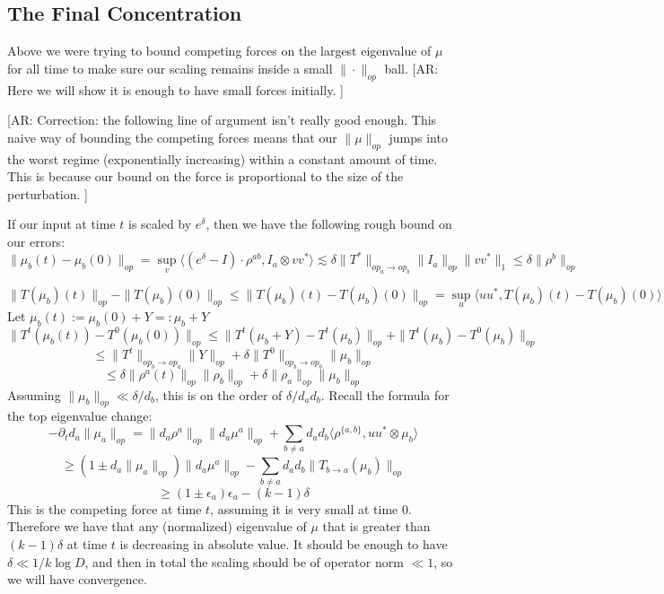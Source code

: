 \documentclass{article}
\newcommand{\AR}[1]{{\color{orange}[AR: #1]}}
\begin{document}
\subsection{The Final Concentration}
Above we were trying to bound competing forces on the largest eigenvalue of $\mu$ for all time to make sure our scaling remains inside a small $\|\cdot\|_{op}$ ball. \AR{Here we will show it is enough to have small forces initially. }

\AR{Correction: the following line of argument isn't really good enough. This naive way of bounding the competing forces means that our $\|\mu\|_{op}$ jumps into the worst regime (exponentially increasing) within a constant amount of time. This is because our bound on the force is proportional to the size of the perturbation. }

If our input at time $t$ is scaled by $e^{\delta}$, then we have the following rough bound on our errors:
\[ \|\mu_{b}(t) - \mu_{b}(0)\|_{op} = \sup_{v} \langle (e^{\delta} - I) \cdot \rho^{ab}, I_{a} \otimes v v^{*} \rangle \lesssim \delta \|T^{*}\|_{op_{a} \to op_{b}} \|I_{a}\|_{op} \|v v^{*} \|_{1} \leq \delta \|\rho^{b}\|_{op}    \]

\[ \|T(\mu_{b})(t)\|_{op} - \|T(\mu_{b})(0)\|_{op} \leq \|T(\mu_{b})(t) - T(\mu_{b})(0)\|_{op}  = \sup_{u} \langle u u^{*}, T(\mu_{b})(t) - T(\mu_{b})(0) \rangle  \]
Let $\mu_{b}(t) := \mu_{b}(0) + Y =: \mu_{b} + Y$
\[ \|T^{t}(\mu_{b}(t)) - T^{0}(\mu_{b}(0))\|_{op} \leq \|T^{t}(\mu_{b} + Y) - T^{t}(\mu_{b})\|_{op} + \|T^{t}(\mu_{b}) - T^{0}(\mu_{b})\|_{op}     \]
\[ \leq \|T^{t}\|_{op_{b} \to op_{a}} \|Y\|_{op} + \delta \|T^{0}\|_{op_{b} \to op_{b}} \|\mu_{b}\|_{op}    \]
\[ \leq \delta \|\rho^{a}(t)\|_{op} \|\rho_{b}\|_{op} + \delta \|\rho_{a}\|_{op} \|\mu_{b}\|_{op}   \]
Assuming $\|\mu_{b}\|_{op} \ll \delta/d_{b}$, this is on the order of $\delta/ d_{a} d_{b}$. Recall the formula for the top eigenvalue change:
\[ -\partial_{t} d_{a} \|\mu_{a}\|_{op} = \|d_{a} \rho^{a}\|_{op} \|d_{a} \mu^{a}\|_{op} + \sum_{b \neq a} d_{a} d_{b} \langle \rho^{\{a,b\}}, u u^{*} \otimes \mu_{b} \rangle     \]
\[ \geq  (1 \pm d_{a} \|\mu_{a}\|_{op}) \|d_{a} \mu^{a}\|_{op} -  \sum_{b \neq a} d_{a} d_{b} \|T_{b \to a}(\mu_{b})\|_{op}   \]
\[ \geq (1 \pm \epsilon_{a}) \epsilon_{a} - (k-1) \delta  \]
This is the competing force at time $t$, assuming it is very small at time $0$. Therefore we have that any (normalized) eigenvalue of $\mu$ that is greater than $(k-1) \delta$ at time $t$ is decreasing in absolute value. It should be enough to have $\delta \ll 1/k \log D$, and then in total the scaling should be of operator norm $\ll 1$, so we will have convergence. 
\end{document}
